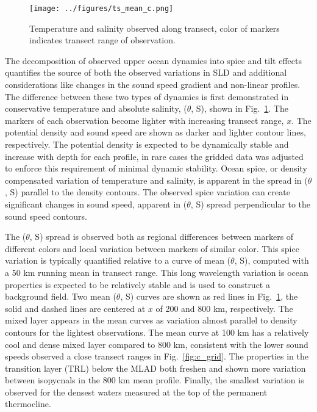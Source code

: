 \documentclass[preprint,NumberedRefs]{JASA}
\begin{document}
\begin{figure}
\texttt{[image: ../figures/ts\_mean\_c.png]}
\caption{\label{fig:ts_diagram}{Temperature and salinity observed along transect, color of markers indicates transect range of observation.}}
\end{figure}
The decomposition of observed upper ocean dynamics into spice and tilt effects quantifies the source of both the observed variations in SLD and additional considerations like changes in the sound speed gradient and non-linear profiles. The difference between these two types of dynamics is first demonstrated in conservative temperature and absolute salinity, ($\theta$, S), shown in Fig.~\ref{fig:ts_diagram}. The markers of each observation become lighter with increasing transect range, $x$. The potential density and sound speed are shown as darker and lighter contour lines, respectively. The potential density is expected to be dynamically stable and increase with depth for each profile, in rare cases the gridded data was adjusted to enforce this requirement of minimal dynamic stability\citep{barker2017stabilizing}. Ocean spice, or density compensated variation of temperature and salinity, is apparent in the spread in ($\theta$, S) parallel to the density contours. The observed spice variation can create significant changes in sound speed, apparent in ($\theta$, S) spread perpendicular to the sound speed contours.

The ($\theta$, S) spread is observed both as regional differences between markers of different colors and local variation between markers of similar color. This spice variation is typically quantified relative to a curve of mean ($\theta$, S), computed with a 50 km running mean in transect range. This long wavelength variation is ocean properties is expected to be relatively stable and is used to construct a background field\cite{dzieciuch2004}. Two mean ($\theta$, S) curves are shown as red lines in Fig.~\ref{fig:ts_diagram}, the solid and dashed lines are centered at $x$ of 200 and 800 km, respectively. The mixed layer appears in the mean curves as variation almost parallel to density contours for the lightest observations. The mean curve at 100 km has a relatively cool and dense mixed layer compared to 800 km, consistent with the lower sound speeds observed a close transect ranges in Fig.~\ref{fig:c_grid}. The properties in the transition layer (TRL) below the MLAD both freshen and shown more variation between isopycnals in the 800 km mean profile. Finally, the smallest variation is observed for the densest waters measured at the top of the permanent thermocline\cite{cole2010seasonal}.
\end{document}
